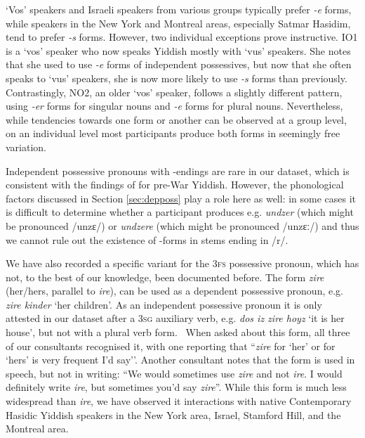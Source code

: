 \documentclass[output=paper, hidelinks]{langscibook}
\begin{document}
`Vos' speakers and Israeli speakers from various groups typically prefer \textit{-e} forms, while speakers in the New York and Montreal areas, especially Satmar Hasidim, tend to prefer \textit{-s} forms. However, two individual exceptions prove instructive. IO1 is a `vos' speaker who now speaks Yiddish mostly with `vus' speakers. She notes that she used to use \textit{-e} forms of independent possessives, but now that she often speaks to `vus' speakers, she is now more likely to use \textit{-s} forms than previously. Contrastingly, NO2, an older `vos' speaker, follows a slightly different pattern, using \textit{-er} forms for singular nouns and \textit{-e} forms for plural nouns. Nevertheless, while tendencies towards one form or another can be observed at a group level, on an individual level most participants produce both forms in seemingly free variation. 

\hspace*{-2.7pt}Independent possessive pronouns with \varnothing-endings are rare in our dataset, which is consistent with the findings of \citep[242--243]{Mark78} for pre-War Yiddish. However, the phonological factors discussed in Section \ref{sec:depposs} play a role here as well: in some cases it is difficult to determine whether a participant produces e.g. \textit{undzer} (which might be pronounced /unzɛ/) or \textit{undzere} (which might be pronounced /unzɛː/) and thus we cannot rule out the existence of \varnothing-forms in stems ending in /r/.


\largerpage
We have also recorded a specific variant for the 3\textsc{\textsc{fs}} possessive pronoun, which has not, to the best of our knowledge, been documented before. The form \textit{zire} (her/hers, parallel to \textit{ire}), can be used as a dependent possessive pronoun, e.g. \textit{zire kinder} `her children'. As an independent possessive pronoun it is only attested in our dataset after a 3\textsc{sg} auxiliary verb, e.g. \textit{dos iz zire hoyz} `it is her house', but not with a plural verb form.~%
 When asked about this form, all three of our consultants recognised it, with one reporting that ``\textit{zire} for `her’ or for `hers’ is very frequent I’d say''. Another consultant notes that the form is used in speech, but not in writing: ``We would sometimes use \textit{zire} and not \textit{ire}. I would definitely write \textit{ire}, but sometimes you'd say \textit{zire}''. While this form is much less widespread than \textit{ire}, we have observed it interactions with native Contemporary Hasidic Yiddish speakers in the New York area, Israel, Stamford Hill, and the Montreal area.
\end{document}
